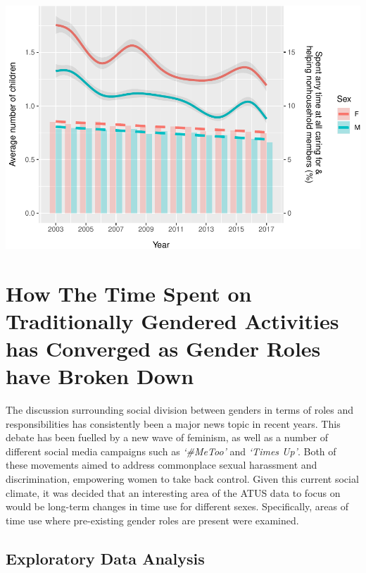 \documentclass[11pt,]{article}
\begin{document}
\includegraphics{Final-Report_files/figure-latex/part_tu04 Sex Plot with Number of Children Plotting-1.pdf}

\hypertarget{how-the-time-spent-on-traditionally-gendered-activities-has-converged-as-gender-roles-have-broken-down}{%
\section{How The Time Spent on Traditionally Gendered Activities has
Converged as Gender Roles have Broken
Down}\label{how-the-time-spent-on-traditionally-gendered-activities-has-converged-as-gender-roles-have-broken-down}}

The discussion surrounding social division between genders in terms of
roles and responsibilities has consistently been a major news topic in
recent years. This debate has been fuelled by a new wave of feminism, as
well as a number of different social media campaigns such as
\emph{`\#MeToo'} and \emph{`Times Up'}. Both of these movements aimed to
address commonplace sexual harassment and discrimination, empowering
women to take back control. Given this current social climate, it was
decided that an interesting area of the ATUS data to focus on would be
long-term changes in time use for different sexes. Specifically, areas
of time use where pre-existing gender roles are present were examined.

\hypertarget{exploratory-data-analysis-1}{%
\subsection{Exploratory Data
Analysis}\label{exploratory-data-analysis-1}}
\end{document}
